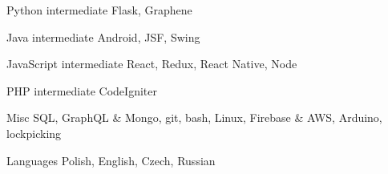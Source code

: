 
\begin{cvskills}

	\cvskill
		{Python}
		{intermediate}
		{Flask, Graphene}

	\cvskill
		{Java}
		{intermediate}
		{Android, JSF, Swing}

	\cvskill
		{JavaScript}
		{intermediate}
		{React, Redux, React Native, Node}

	\cvskill
		{PHP}
		{intermediate}
		{CodeIgniter}

	\cvskill
		{Misc}
		{}
		{SQL, GraphQL \& Mongo, git, bash, Linux, Firebase \& AWS, Arduino, lockpicking}

	\cvskill
		{Languages}
		{}
		{Polish, English, Czech, Russian}

\end{cvskills}
